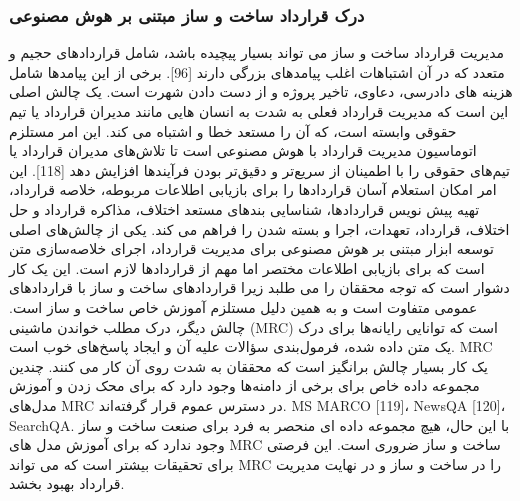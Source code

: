 \documentclass[towcolumn, 11pt]{Article}
\begin{document}
\begin{چکیده}
\subsubsection{درک قرارداد ساخت و ساز مبتنی بر هوش مصنوعی}
مدیریت قرارداد ساخت و ساز می تواند بسیار پیچیده باشد، شامل قراردادهای حجیم و متعدد که در آن اشتباهات اغلب پیامدهای بزرگی دارند [96]. برخی از این پیامدها شامل هزینه های دادرسی، دعاوی، تاخیر پروژه و از دست دادن شهرت است. یک چالش اصلی این است که مدیریت قرارداد فعلی به شدت به انسان هایی مانند مدیران قرارداد یا تیم حقوقی وابسته است، که آن را مستعد خطا و اشتباه می کند. این امر مستلزم اتوماسیون مدیریت قرارداد با هوش مصنوعی است تا تلاش‌های مدیران قرارداد یا تیم‌های حقوقی را با اطمینان از سریع‌تر و دقیق‌تر بودن فرآیندها افزایش دهد [118]. این امر امکان استعلام آسان قراردادها را برای بازیابی اطلاعات مربوطه، خلاصه قرارداد، تهیه پیش نویس قراردادها، شناسایی بندهای مستعد اختلاف، مذاکره قرارداد و حل اختلاف، قرارداد، تعهدات، اجرا و بسته شدن را فراهم می کند.
یکی از چالش‌های اصلی توسعه ابزار مبتنی بر هوش مصنوعی برای مدیریت قرارداد، اجرای خلاصه‌سازی متن است که برای بازیابی اطلاعات مختصر اما مهم از قراردادها لازم است. این یک کار دشوار است که توجه محققان را می طلبد زیرا قراردادهای ساخت و ساز با قراردادهای عمومی متفاوت است و به همین دلیل مستلزم آموزش خاص ساخت و ساز است. چالش دیگر، درک مطلب خواندن ماشینی (MRC) است که توانایی رایانه‌ها برای درک یک متن داده شده، فرمول‌بندی سؤالات علیه آن و ایجاد پاسخ‌های خوب است. MRC یک کار بسیار چالش برانگیز است که محققان به شدت روی آن کار می کنند. چندین مجموعه داده خاص برای برخی از دامنه‌ها وجود دارد که برای محک زدن و آموزش مدل‌های MRC در دسترس عموم قرار گرفته‌اند. MS MARCO [119]، NewsQA [120]، SearchQA. با این حال، هیچ مجموعه داده ای منحصر به فرد برای صنعت ساخت و ساز وجود ندارد که برای آموزش مدل های MRC ساخت و ساز ضروری است. این فرصتی برای تحقیقات بیشتر است که می تواند MRC را در ساخت و ساز و در نهایت مدیریت قرارداد بهبود بخشد.


\end{چکیده}
\end{document}
